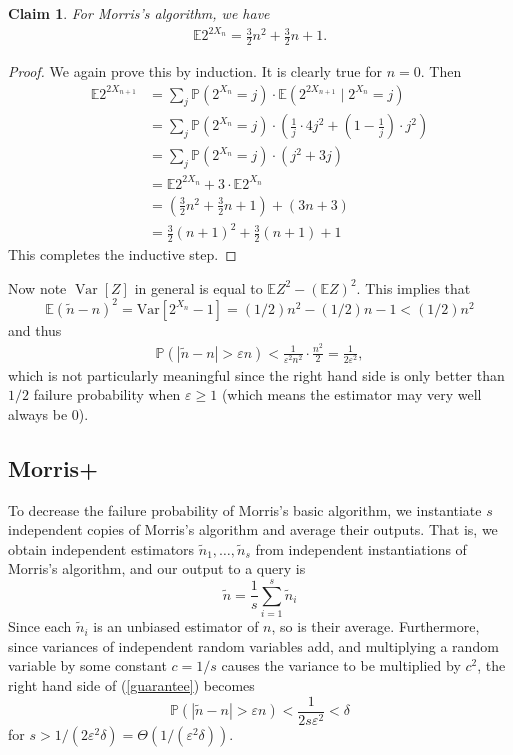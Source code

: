 \documentclass[11pt]{article}
\newcommand{\eps}{\varepsilon}
\newtheorem{claim}[theorem]{Claim}
\begin{document}
\begin{claim}
For Morris's algorithm, we have
\begin{align}
\mathbb{E}2^{2X_n} = \frac{3}{2}n^2+\frac{3}{2}n+1.
\end{align}
\end{claim}
\begin{proof}
We again prove this by induction. It is clearly true for $n=0$. Then
\allowdisplaybreaks
\begin{align*}
\mathbb{E} 2^{2X_{n+1}} &= \sum_j \mathbb{P}(2^{X_n} = j) \cdot \mathbb{E}(2^{2X_{n+1}} \mid 2^{X_n} = j)\\
&= \sum_j \mathbb{P}(2^{X_n} = j) \cdot \left(\frac{1}{j}\cdot 4j^2 + \left(1- \frac{1}{j}\right)\cdot j^2\right)\\
&= \sum_j \mathbb{P}(2^{X_n} = j) \cdot (j^2 + 3j)\\
&= \mathbb{E} 2^{2X_n} + 3\cdot \mathbb{E} 2^{X_n}\\
&= \left(\frac 32n^2 + \frac 32n + 1\right) + \left(3n + 3\right)\\
&= \frac 32(n+1)^2 + \frac 32(n+1) + 1
\end{align*}
This completes the inductive step.
\end{proof}

Now note $\operatorname{Var}[Z]$ in general is equal to $\mathbb{E}Z^2 - (\mathbb{E}Z)^2$. This implies that
\[
    \mathbb{E} (\tilde{n} - n)^2 = \text{Var}[2^{X_n} - 1] = (1/2)n^2 - (1/2)n - 1 < (1/2)n^2
\]
and thus
\begin{align}
\mathbb{P} (|\tilde{n}-n|>\varepsilon n)<\frac{1}{\varepsilon^2n^2}\cdot \frac{n^2}{2}=\frac{1}{2\varepsilon^2} , \label{guarantee}
\end{align}
which is not particularly meaningful since the right hand side is only better than $1/2$ failure probability when $\eps \ge 1$ (which means the estimator may very well always be $0$).

\subsection{Morris+}
To decrease the failure probability of Morris's basic algorithm, we instantiate $s$ independent copies of Morris's algorithm and average their outputs. That is, we obtain independent estimators $\tilde{n}_1,\ldots,\tilde{n}_s$ from independent instantiations of Morris's algorithm, and our output to a query is
$$
\tilde{n} = \frac 1s\sum_{i=1}^s \tilde{n}_i
$$
Since each $\tilde{n}_i$ is an unbiased estimator of $n$, so is their average. Furthermore, since variances of independent random variables add, and multiplying a random variable by some constant $c = 1/s$ causes the variance to be multiplied by $c^2$, the right hand side of (\ref{guarantee}) becomes 
$$
\mathbb{P} (|\tilde{n}-n|>\varepsilon n) < \frac{1}{2s\varepsilon^2}< \delta
$$ 
for $s> 1/(2\eps^2\delta) = \Theta(1/(\eps^2\delta))$.
\end{document}
